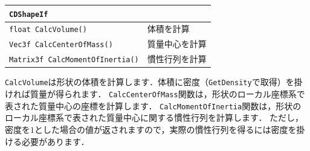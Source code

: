 \begin{center}
\begin{tabular}{lll}
\multicolumn{3}{l}{\texttt{CDShapeIf}}							\\ \midrule
\multicolumn{2}{l}{\texttt{float CalcVolume()}}					& \KLUDGE 体積を計算		\\
\multicolumn{2}{l}{\texttt{Vec3f CalcCenterOfMass()}}			& \KLUDGE 質量中心を計算	\\
\multicolumn{2}{l}{\texttt{Matrix3f CalcMomentOfInertia()}}		& \KLUDGE 慣性行列を計算	\\
\end{tabular}
\end{center}

\texttt{CalcVolume}\KLUDGE は形状の体積を計算します．体積に密度（\texttt{GetDensity}\KLUDGE で取得）を掛ければ質量が得られます．
\texttt{CalcCenterOfMass}\KLUDGE 関数は，形状のローカル座標系で表された質量中心の座標を計算します．
\texttt{CalcMomentOfInertia}\KLUDGE 関数は，形状のローカル座標系で表された質量中心に関する慣性行列を計算します．
\KLUDGE ただし，密度を$1$\KLUDGE とした場合の値が返されますので，実際の慣性行列を得るには密度を掛ける必要があります．

